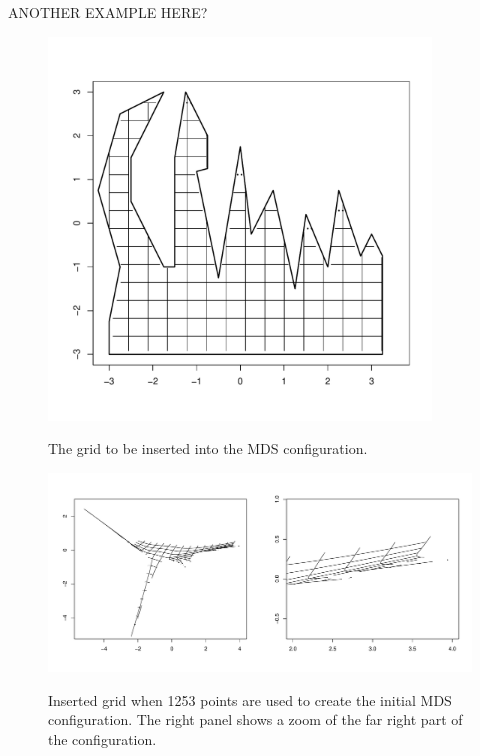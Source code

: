 \documentclass[a4paper,10pt]{article}
\begin{document}
ANOTHER EXAMPLE HERE?

\begin{figure}
\centering
\includegraphics[width=4in]{figs/wt2-grid-orig.pdf} \\
\caption{The grid to be inserted into the MDS configuration.}
\label{wt2-grid-orig}
\end{figure}

\begin{figure}
\centering
\includegraphics[width=5in]{figs/wt2-grid-full.pdf} \\
\caption{Inserted grid when 1253 points are used to create the initial MDS configuration. The right panel shows a zoom of the far right part of the configuration.}
\label{wt2-grid-full}
\end{figure}
\end{document}
